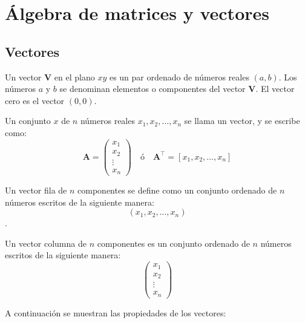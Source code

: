 \chapter{Álgebra de matrices y vectores}

\section{Vectores} 

\begin{definition}[Vector]
Un vector $\boldsymbol{V}$ en el plano $xy$ es un par ordenado de números reales $(a, b)$. Los números $a$ y $b$ se denominan elementos o componentes del vector $\boldsymbol{V}$. El vector cero es el vector $(0, 0)$.

\end{definition}
\begin{definition}
Un conjunto $x$ de $n$ números reales $x_1, x_2, \ldots, x_n$ se llama un vector, y se escribe como:\\
  \[
\boldsymbol{A} = \begin{pmatrix}
x_1 \\
x_2 \\
\vdots \\
x_n
\end{pmatrix}
\quad
\text{ó}
\quad
\boldsymbol{A}^\top = [x_1, x_2, \ldots, x_n]
\]

\end{definition}
\begin{definition}
Un vector fila de $n$ componentes se define como un conjunto ordenado de $n$ números escritos de la siguiente manera: $$(x_1, x_2, \ldots, x_n)$$.    
\end{definition}
\begin{definition}
Un vector columna de $n$ componentes es un conjunto ordenado de $n$ números escritos de la siguiente manera:
\[
\begin{pmatrix}
x_1 \\
x_2 \\
\vdots \\
x_n
\end{pmatrix}
\]  
\end{definition}
A continuación se muestran las propiedades de los vectores:\\

